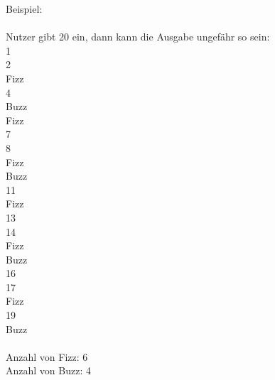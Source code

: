 \documentclass[a4paper,12pt]{article}
\begin{document}
Beispiel: \\
\\
Nutzer gibt 20 ein, dann kann die Ausgabe ungefähr so sein:
\\
1 \\
2 \\
Fizz \\
4 \\
Buzz \\
Fizz \\
7 \\
8 \\
Fizz \\
Buzz \\
11 \\
Fizz \\
13 \\
14 \\
Fizz \\
Buzz \\
16 \\
17 \\
Fizz \\
19\\
Buzz\\
\\
Anzahl von Fizz: 6\\
Anzahl von Buzz: 4\\
\end{document}
